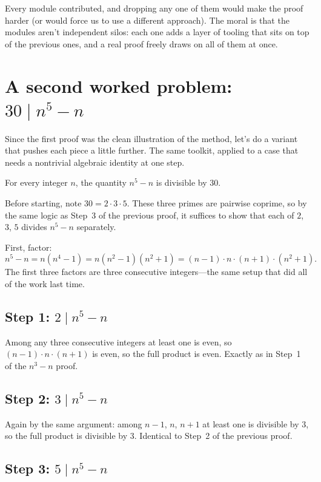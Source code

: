 \documentclass[11pt]{article}
\begin{document}
Every module contributed, and dropping any one of them would make the proof harder (or would force us to use a different approach). The moral is that the modules aren't independent silos: each one adds a layer of tooling that sits on top of the previous ones, and a real proof freely draws on all of them at once.

\section*{A second worked problem: $30 \mid n^5 - n$}

Since the first proof was the clean illustration of the method, let's do a variant that pushes each piece a little further. The same toolkit, applied to a case that needs a nontrivial algebraic identity at one step.

\begin{theorem}
For every integer $n$, the quantity $n^5 - n$ is divisible by $30$.
\end{theorem}

Before starting, note $30 = 2 \cdot 3 \cdot 5$. These three primes are pairwise coprime, so by the same logic as Step~3 of the previous proof, it suffices to show that each of $2$, $3$, $5$ divides $n^5 - n$ separately.

First, factor:
\[
  n^5 - n = n(n^4 - 1) = n(n^2 - 1)(n^2 + 1) = (n-1)\cdot n\cdot(n+1)\cdot(n^2 + 1).
\]
The first three factors are three consecutive integers---the same setup that did all of the work last time.

\subsection*{Step 1: $2 \mid n^5 - n$}

Among any three consecutive integers at least one is even, so $(n-1)\cdot n\cdot (n+1)$ is even, so the full product is even. Exactly as in Step~1 of the $n^3 - n$ proof.

\subsection*{Step 2: $3 \mid n^5 - n$}

Again by the same argument: among $n-1$, $n$, $n+1$ at least one is divisible by $3$, so the full product is divisible by $3$. Identical to Step~2 of the previous proof.

\subsection*{Step 3: $5 \mid n^5 - n$}
\end{document}

